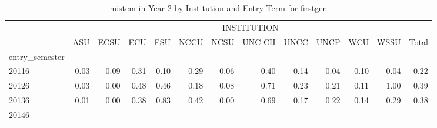 \begin{table}[!h]
\caption{mistem in Year 2 by Institution and Entry Term for firstgen}
\centering
\begin{tabular}{lllllllllllll}
\cline{1-13}
\multicolumn{1}{c}{} &
  \multicolumn{12}{|c}{INSTITUTION} \\
\multicolumn{1}{c}{} &
  \multicolumn{1}{|r}{ASU} &
  \multicolumn{1}{r}{ECSU} &
  \multicolumn{1}{r}{ECU} &
  \multicolumn{1}{r}{FSU} &
  \multicolumn{1}{r}{NCCU} &
  \multicolumn{1}{r}{NCSU} &
  \multicolumn{1}{r}{UNC-CH} &
  \multicolumn{1}{r}{UNCC} &
  \multicolumn{1}{r}{UNCP} &
  \multicolumn{1}{r}{WCU} &
  \multicolumn{1}{r}{WSSU} &
  \multicolumn{1}{r}{Total} \\
\cline{1-13}
\multicolumn{1}{l}{entry\_semester} &
  \multicolumn{1}{|r}{} &
  \multicolumn{1}{r}{} &
  \multicolumn{1}{r}{} &
  \multicolumn{1}{r}{} &
  \multicolumn{1}{r}{} &
  \multicolumn{1}{r}{} &
  \multicolumn{1}{r}{} &
  \multicolumn{1}{r}{} &
  \multicolumn{1}{r}{} &
  \multicolumn{1}{r}{} &
  \multicolumn{1}{r}{} &
  \multicolumn{1}{r}{} \\
\multicolumn{1}{l}{\hspace{1em}20116} &
  \multicolumn{1}{|r}{0.03} &
  \multicolumn{1}{r}{0.09} &
  \multicolumn{1}{r}{0.31} &
  \multicolumn{1}{r}{0.10} &
  \multicolumn{1}{r}{0.29} &
  \multicolumn{1}{r}{0.06} &
  \multicolumn{1}{r}{0.40} &
  \multicolumn{1}{r}{0.14} &
  \multicolumn{1}{r}{0.04} &
  \multicolumn{1}{r}{0.10} &
  \multicolumn{1}{r}{0.04} &
  \multicolumn{1}{r}{0.22} \\
\multicolumn{1}{l}{\hspace{1em}20126} &
  \multicolumn{1}{|r}{0.03} &
  \multicolumn{1}{r}{0.00} &
  \multicolumn{1}{r}{0.48} &
  \multicolumn{1}{r}{0.46} &
  \multicolumn{1}{r}{0.18} &
  \multicolumn{1}{r}{0.08} &
  \multicolumn{1}{r}{0.71} &
  \multicolumn{1}{r}{0.23} &
  \multicolumn{1}{r}{0.21} &
  \multicolumn{1}{r}{0.11} &
  \multicolumn{1}{r}{1.00} &
  \multicolumn{1}{r}{0.39} \\
\multicolumn{1}{l}{\hspace{1em}20136} &
  \multicolumn{1}{|r}{0.01} &
  \multicolumn{1}{r}{0.00} &
  \multicolumn{1}{r}{0.38} &
  \multicolumn{1}{r}{0.83} &
  \multicolumn{1}{r}{0.42} &
  \multicolumn{1}{r}{0.00} &
  \multicolumn{1}{r}{0.69} &
  \multicolumn{1}{r}{0.17} &
  \multicolumn{1}{r}{0.22} &
  \multicolumn{1}{r}{0.14} &
  \multicolumn{1}{r}{0.29} &
  \multicolumn{1}{r}{0.38} \\
\multicolumn{1}{l}{\hspace{1em}20146} &

\end{tabular}
\end{table}
